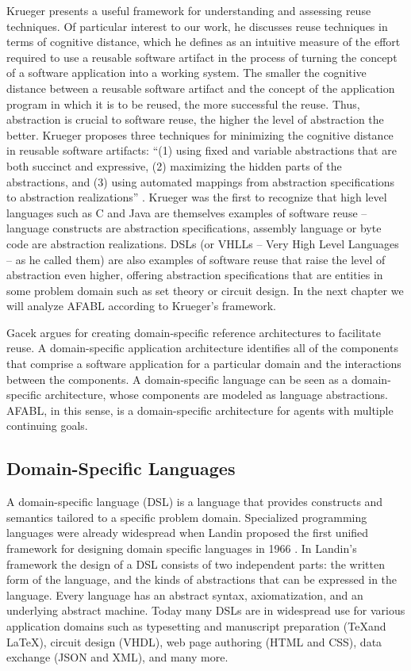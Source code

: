 Krueger presents a useful framework for understanding and assessing reuse techniques. Of particular interest to our work, he discusses reuse techniques in terms of cognitive distance, which he defines as an intuitive measure of the effort required to use a reusable software artifact in the process of turning the concept of a software application into a working system. The smaller the cognitive distance between a reusable software artifact and the concept of the application program in which it is to be reused, the more successful the reuse. Thus, abstraction is crucial to software reuse, the higher the level of abstraction the better. Krueger proposes three techniques for minimizing the cognitive distance in reusable software artifacts: ``(1) using fixed and variable abstractions that are both succinct and expressive, (2) maximizing the hidden parts of the abstractions, and (3) using automated mappings from abstraction specifications to abstraction realizations'' \cite{krueger1992a-software}. Krueger was the first to recognize that high level languages such as C and Java are themselves examples of software reuse -- language constructs are abstraction specifications, assembly language or byte code are abstraction realizations. DSLs (or VHLLs -- Very High Level Languages -- as he called them) are also examples of software reuse that raise the level of abstraction even higher, offering abstraction specifications that are entities in some problem domain such as set theory or circuit design. In the next chapter we will analyze AFABL according to Krueger's framework.

Gacek argues for creating domain-specific reference architectures to facilitate reuse\cite{gacek1995a-exploiting}. A domain-specific application architecture identifies all of the components that comprise a software application for a particular domain and the interactions between the components. A domain-specific language can be seen as a domain-specific architecture, whose components are modeled as language abstractions. AFABL, in this sense, is a domain-specific architecture for agents with multiple continuing goals.

\subsection{Domain-Specific Languages}

A domain-specific language (DSL) is a language that provides constructs and semantics tailored to a specific problem domain. Specialized programming languages were already widespread when Landin proposed the first unified framework for designing domain specific languages in 1966 \cite{landin1966next}. In Landin's framework the design of a DSL consists of two independent parts: the written form of the language, and the kinds of abstractions that can be expressed in the language. Every language has an abstract syntax, axiomatization, and an underlying abstract machine. Today many DSLs are in widespread use for various application domains such as typesetting and manuscript preparation (\TeX and \LaTeX), circuit design (VHDL), web page authoring (HTML and CSS), data exchange (JSON and XML), and many more.

